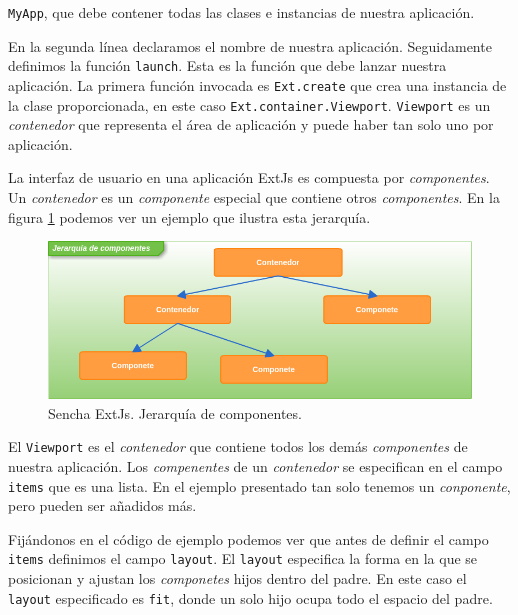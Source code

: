 	\texttt{MyApp}, que debe contener todas las clases e instancias de nuestra aplicación.
 	\par
	En la segunda línea declaramos el nombre de nuestra aplicación. Seguidamente definimos la función \texttt{launch}. Esta es la función que debe
	lanzar nuestra aplicación. La primera función invocada es \texttt{Ext.create} que crea una instancia de la clase proporcionada, en este caso
	\texttt{Ext.container.Viewport}. \texttt{Viewport} es un \emph{contenedor} que representa el área de aplicación y puede haber tan solo uno por
	aplicación. 
 	\par
	La interfaz de usuario en una aplicación ExtJs es compuesta por \emph{componentes}. Un \emph{contenedor} es un \emph{componente} especial que
	contiene otros \emph{componentes}. En la figura \ref{fig:comps} podemos ver un ejemplo que ilustra esta jerarquía.
	\begin{figure}[h]
		\centering
		\includegraphics[keepaspectratio, width=1\textwidth]{./img/comps.png}
		\caption{Sencha ExtJs. Jerarquía de componentes.}   
		\label{fig:comps}
	\end{figure}
 	\par
	El \texttt{Viewport} es el \emph{contenedor} que contiene todos los demás \emph{componentes} de nuestra aplicación. Los \emph{compenentes} de
	un \emph{contenedor} se especifican en el campo \texttt{items} que es una lista. En el ejemplo presentado tan solo tenemos un
	\emph{conponente}, pero pueden ser añadidos más.
 	\par
	Fijándonos en el código de ejemplo podemos ver que antes de definir el campo \texttt{items} definimos el campo \texttt{layout}. El
	\texttt{layout} especifica la forma en la que se posicionan y ajustan los \emph{componetes} hijos dentro del padre. En este caso el
	\texttt{layout} especificado es \texttt{\cc fit\cc}, donde un solo hijo ocupa todo el espacio del padre.
